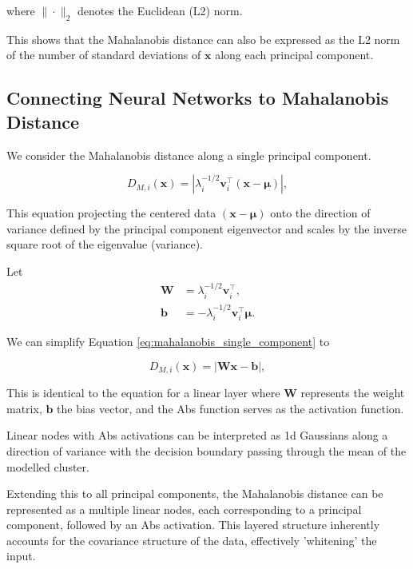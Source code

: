 where $\| \cdot \|_2$ denotes the Euclidean (L2) norm. 

This shows that the Mahalanobis distance can also be expressed as the L2 norm of the number of standard deviations of \(\mathbf{x}\) along each principal component.

\subsection{Connecting Neural Networks to Mahalanobis Distance}

We consider the Mahalanobis distance along a single principal component.

\begin{equation}
    \label{eq:mahalanobis_single_component}
    D_{M,i}(\mathbf{x}) = \left| \lambda_i^{-1/2} \mathbf{v}_i^\top (\mathbf{x} - \boldsymbol{\mu}) \right|,
\end{equation}

This equation projecting the centered data $(\mathbf{x} - \boldsymbol{\mu})$ onto the direction of variance defined by the principal component eigenvector and scales by the inverse square root of the eigenvalue (variance).

Let 
\begin{align}
    \mathbf{W} &= \lambda_i^{-1/2} \mathbf{v}_i^\top, \\
    \mathbf{b} &= - \lambda_i^{-1/2} \mathbf{v}_i^\top \boldsymbol{\mu}.
\end{align}

We can simplify Equation \eqref{eq:mahalanobis_single_component} to

\begin{equation}
    \label{eq:mahalanobis_linear}
    D_{M,i}(\mathbf{x}) = \left| \mathbf{W} \mathbf{x} - \mathbf{b} \right|,
\end{equation}

This is identical to the equation for a linear layer where $\boldsymbol{W}$ represents the weight matrix, $\boldsymbol{b}$ the bias vector, and the Abs function serves as the activation function.

Linear nodes with Abs activations can be interpreted as 1d Gaussians along a direction of variance with the decision boundary passing through the mean of the modelled cluster.

Extending this to all principal components, the Mahalanobis distance can be represented as a multiple linear nodes, each corresponding to a principal component, followed by an Abs activation. This layered structure inherently accounts for the covariance structure of the data, effectively 'whitening' the input.

